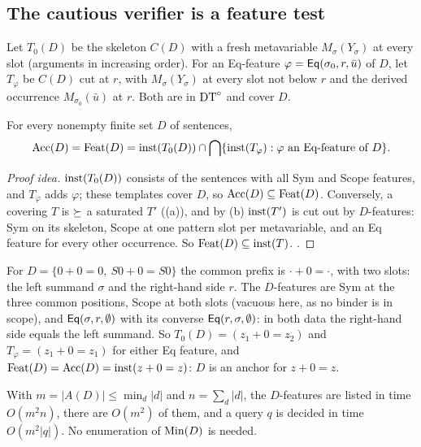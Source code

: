\subsection{The cautious verifier is a feature test}\label{sec:single:feat}

Let $T_0(D)$ be the skeleton $C(D)$ with a fresh metavariable $M_\sigma(Y_\sigma)$ at every slot (arguments in increasing order). For an Eq-feature $\varphi=\mathsf{Eq}(\sigma_0,r,\bar u)$ of $D$, let $T_\varphi$ be $C(D)$ cut at $r$, with $M_\sigma(Y_\sigma)$ at every slot not below $r$ and the derived occurrence $M_{\sigma_0}(\bar u)$ at $r$. Both are in $\mathrm{DT}^{\circ}$ and cover $D$.

\begin{theorem}\label{thm:single:feat}
For every nonempty finite set $D$ of sentences,
\[
\mathrm{Acc}(D)=\mathrm{Feat}(D)=\mathrm{inst}(T_0(D))\cap\bigcap\{\mathrm{inst}(T_\varphi):\varphi\text{ an Eq-feature of }D\}.
\]
\end{theorem}

\begin{proof}[Proof idea]
$\mathrm{inst}(T_0(D))$ consists of the sentences with all Sym and Scope features, and $T_\varphi$ adds $\varphi$; these templates cover $D$, so $\mathrm{Acc}(D)\subseteq\mathrm{Feat}(D)$. Conversely, a covering $T$ is $\succeq$ a saturated $T'$ ((a)), and by (b) $\mathrm{inst}(T')$ is cut out by $D$-features: Sym on its skeleton, Scope at one pattern slot per metavariable, and an Eq feature for every other occurrence. So $\mathrm{Feat}(D)\subseteq\mathrm{inst}(T)$. .
\end{proof}

\begin{example}[Features]\label{ex:single:features}
For $D=\{0+0=0,\ S0+0=S0\}$ the common prefix is $\cdot+0=\cdot$, with two slots: the left summand $\sigma$ and the right-hand side $r$. The $D$-features are Sym at the three common positions, Scope at both slots (vacuous here, as no binder is in scope), and $\mathsf{Eq}(\sigma,r,\emptyset)$ with its converse $\mathsf{Eq}(r,\sigma,\emptyset)$: in both data the right-hand side equals the left summand. So $T_0(D)=(z_1+0=z_2)$ and $T_\varphi=(z_1+0=z_1)$ for either Eq feature, and $\mathrm{Feat}(D)=\mathrm{Acc}(D)=\mathrm{inst}(z+0=z)$: $D$ is an anchor for $z+0=z$.
\end{example}

\begin{corollary}\label{cor:single:poly}
With $m=|A(D)|\le\min_d|d|$ and $n=\sum_d|d|$, the $D$-features are listed in time $O(m^2n)$, there are $O(m^2)$ of them, and a query $q$ is decided in time $O(m^2|q|)$. No enumeration of $\mathrm{Min}(D)$ is needed.
\end{corollary}

